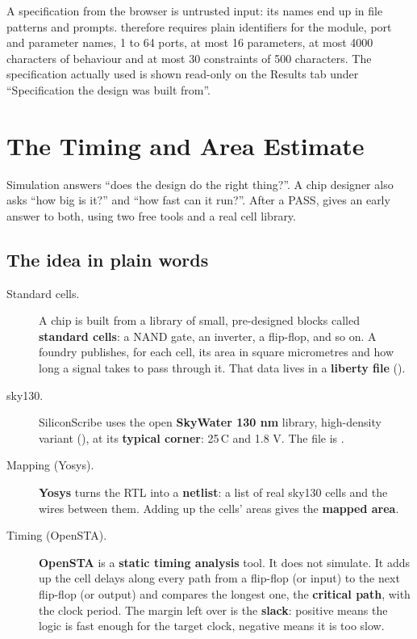 A specification from the browser is untrusted input: its names end up in file patterns and prompts.  therefore requires plain identifiers for the module, port and parameter names, 1 to 64 ports, at most 16 parameters, at most 4000 characters of behaviour and at most 30 constraints of 500 characters. The specification actually used is shown read-only on the Results tab under ``Specification the design was built from''.

\chapter{The Timing and Area Estimate}
\label{ch:timing}

Simulation answers ``does the design do the right thing?''. A chip designer also asks ``how big is it?'' and ``how fast can it run?''. After a PASS,  gives an early answer to both, using two free tools and a real cell library.

\section{The idea in plain words}

\begin{description}
  \item[Standard cells.] A chip is built from a library of small, pre-designed blocks called \textbf{standard cells}: a NAND gate, an inverter, a flip-flop, and so on. A foundry publishes, for each cell, its area in square micrometres and how long a signal takes to pass through it. That data lives in a \textbf{liberty file} ().
  \item[sky130.] SiliconScribe uses the open \textbf{SkyWater 130 nm} library, high-density variant (), at its \textbf{typical corner}: 25\,\textdegree C and 1.8 V. The file is .
  \item[Mapping (Yosys).] \textbf{Yosys} turns the RTL into a \textbf{netlist}: a list of real sky130 cells and the wires between them. Adding up the cells' areas gives the \textbf{mapped area}.
  \item[Timing (OpenSTA).] \textbf{OpenSTA} is a \textbf{static timing analysis} tool. It does not simulate. It adds up the cell delays along every path from a flip-flop (or input) to the next flip-flop (or output) and compares the longest one, the \textbf{critical path}, with the clock period. The margin left over is the \textbf{slack}: positive means the logic is fast enough for the target clock, negative means it is too slow.
\end{description}

